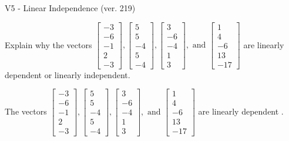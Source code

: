 \begin{exercise}
  \begin{exerciseTitle}V5 - Linear Independence (ver. 219)\end{exerciseTitle}
  \begin{exerciseStatement}
    Explain why the vectors \(\left[\begin{array}{r}
-3 \\
-6 \\
-1 \\
2 \\
-3
\end{array}\right] , \left[\begin{array}{r}
5 \\
5 \\
-4 \\
5 \\
-4
\end{array}\right] , \left[\begin{array}{r}
3 \\
-6 \\
-4 \\
1 \\
3
\end{array}\right] , \text{ and } \left[\begin{array}{r}
1 \\
4 \\
-6 \\
13 \\
-17
\end{array}\right]\) are linearly dependent or linearly independent.	


  \end{exerciseStatement}
  \begin{exerciseAnswer}
   The vectors \(\left[\begin{array}{r}
-3 \\
-6 \\
-1 \\
2 \\
-3
\end{array}\right] , \left[\begin{array}{r}
5 \\
5 \\
-4 \\
5 \\
-4
\end{array}\right] , \left[\begin{array}{r}
3 \\
-6 \\
-4 \\
1 \\
3
\end{array}\right] , \text{ and } \left[\begin{array}{r}
1 \\
4 \\
-6 \\
13 \\
-17
\end{array}\right]\) are 
  	 linearly dependent  .
  


  \end{exerciseAnswer}
\end{exercise}